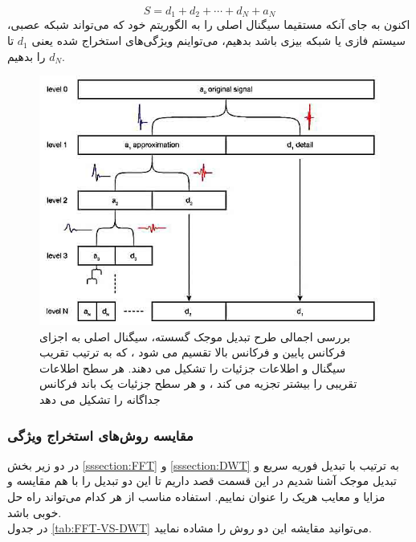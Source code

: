   \begin{equation}\label{eq:WaveletTransfrom}
  S = d_1 + d_2 + \cdots + d_N + a_N   
  \end{equation}
  اکنون به جای آنکه مستقیما سیگنال اصلی را به الگوریتم خود که می‌تواند شبکه عصبی، سیستم فازی یا شبکه بیزی
   باشد بدهیم، می‌تواینم ویژگی‌های استخراج شده یعنی $ d_1 $ تا $ d_N $ را بدهیم.
  \begin{figure}[h]
	\centering
	\includegraphics[width=\linewidth]{figures/wavelet-transform}
	\caption[تبدیل موجک]{بررسی اجمالی طرح تبدیل موجک گسسته، سیگنال اصلی به اجزای فرکانس پایین و فرکانس بالا تقسیم می شود ، که به ترتیب تقریب سیگنال و اطلاعات جزئیات را تشکیل می دهند. هر سطح اطلاعات تقریبی را بیشتر تجزیه می کند ، و هر سطح جزئیات یک باند فرکانس جداگانه را تشکیل می دهد\cite{sundling2006wavelets}}
	\label{fig:wavelet-transform}
\end{figure}

\subsubsection{مقایسه روش‌های استخراج ویژگی}
در دو زیر بخش
\ref{sssection:FFT}
و
\ref{sssection:DWT}
به ترتیب با تبدیل فوریه سریع و تبدیل موجک آشنا شدیم در این قسمت قصد داریم تا این دو تبدیل را با هم مقایسه و مزایا و معایب هریک را عنوان نماییم. استفاده مناسب از هر کدام می‌تواند راه حل خوبی باشد.
\\
در جدول
\ref{tab:FFT-VS-DWT}
می‌توانید مقایشه این دو روش را مشاده نمایید.

